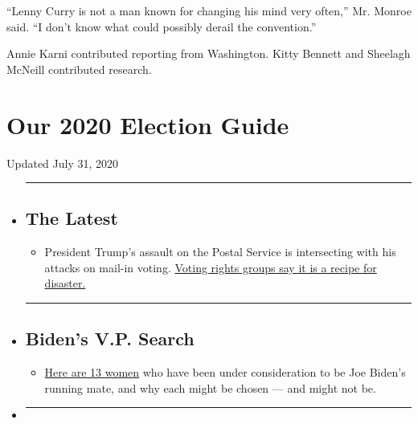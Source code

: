 ``Lenny Curry is not a man known for changing his mind very often,'' Mr.
Monroe said. ``I don't know what could possibly derail the convention.''

Annie Karni contributed reporting from Washington. Kitty Bennett and
Sheelagh McNeill contributed research.

\hypertarget{our-2020-election-guide}{%
\section{Our 2020 Election Guide}\label{our-2020-election-guide}}

Updated July 31, 2020

\begin{itemize}
\item
  \begin{center}\rule{0.5\linewidth}{\linethickness}\end{center}

  \hypertarget{the-latest}{%
  \subsection{The Latest}\label{the-latest}}

  \begin{itemize}
  \tightlist
  \item
    President Trump's assault on the Postal Service is intersecting with
    his attacks on mail-in voting.
    \href{https://www.nytimes.com/2020/07/31/us/politics/trump-usps-mail-delays.html?action=click\&pgtype=Article\&state=default\&region=BELOW_MAIN_CONTENT\&context=storylines_guide}{Voting
    rights groups say it is a recipe for disaster.}
  \end{itemize}
\item
  \begin{center}\rule{0.5\linewidth}{\linethickness}\end{center}

  \hypertarget{bidens-vp-search}{%
  \subsection{Biden's V.P. Search}\label{bidens-vp-search}}

  \begin{itemize}
  \tightlist
  \item
    \href{https://www.nytimes.com/article/biden-vice-president-2020.html?action=click\&pgtype=Article\&state=default\&region=BELOW_MAIN_CONTENT\&context=storylines_guide}{Here
    are 13 women} who have been under consideration to be Joe Biden's
    running mate, and why each might be chosen --- and might not be.
  \end{itemize}
\item
  \begin{center}\rule{0.5\linewidth}{\linethickness}\end{center}


\end{itemize}
